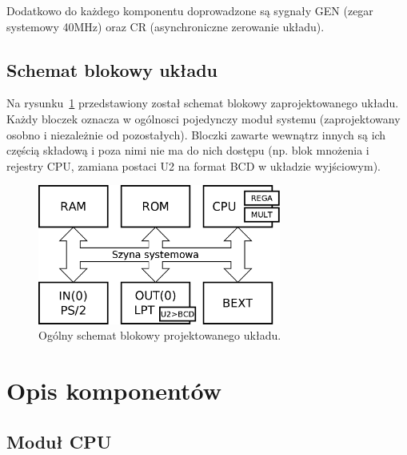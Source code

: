 \documentclass[a4paper,12pt]{report}
\begin{document}
Dodatkowo do każdego komponentu doprowadzone są sygnały GEN (zegar systemowy 40MHz) oraz CR (asynchroniczne zerowanie układu).

\section{Schemat blokowy układu}

Na rysunku~\ref{fig:block} przedstawiony został schemat blokowy zaprojektowanego układu. Każdy bloczek oznacza w ogólnosci pojedynczy moduł systemu (zaprojektowany osobno i niezależnie od pozostałych). Bloczki zawarte wewnątrz innych są ich częścią składową i poza nimi nie ma do nich dostępu (np. blok mnożenia i rejestry CPU, zamiana postaci U2 na format BCD w układzie wyjściowym).

\begin{figure}[h]
\centering
\includegraphics[width=8cm]{./pict/Block.png}
\caption{Ogólny schemat blokowy projektowanego układu.}
\label{fig:block}
\end{figure}

\chapter{Opis komponentów}

\section{Moduł CPU}
\end{document}
